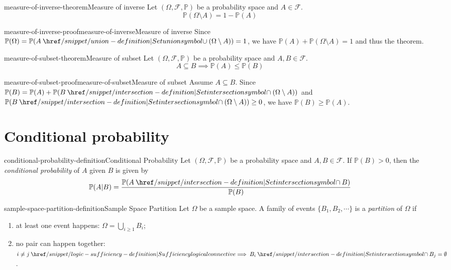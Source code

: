 \documentclass[preview]{standalone}
\begin{document}
\begin{snippettheorem}{measure-of-inverse-theorem}{Measure of inverse}
    Let \((\Omega, \mathcal{F}, \mathbb{P})\) be a probability space and \(A \in \mathcal{F}\).
    \[
        \mathbb{P}(\Omega \setminus A) = 1 - \mathbb{P}(A)
    \]
\end{snippettheorem}

\begin{snippetproof}{measure-of-inverse-proof}{measure-of-inverse}{Measure of inverse}
    Since \(\mathbb{P}(\Omega) = \mathbb{P}(A \union (\Omega \setminus A)) = 1\),
    we have \(\mathbb{P}(A) + \mathbb{P}(\Omega \setminus A) = 1\)
    and thus the theorem.
\end{snippetproof}

\begin{snippettheorem}{measure-of-subset-theorem}{Measure of subset}
    Let \((\Omega, \mathcal{F}, \mathbb{P})\) be a probability space and \(A, B \in \mathcal{F}\).
    \[
        A \subseteq B \implies \mathbb{P}(A) \leq \mathbb{P}(B)
    \]
\end{snippettheorem}

\begin{snippetproof}{measure-of-subset-proof}{measure-of-subset}{Measure of subset}
    Assume \(A \subseteq B\). Since \(\mathbb{P}(B) = \mathbb{P}(A) + \mathbb{P}(B \intersection (\Omega \setminus A))\)
    and \(\mathbb{P}(B \intersection (\Omega \setminus A)) \geq 0\), we have \(\mathbb{P}(B) \geq \mathbb{P}(A)\).
\end{snippetproof}

\section{Conditional probability}

\begin{snippetdefinition}{conditional-probability-definition}{Conditional Probability}
    Let \((\Omega, \mathcal{F}, \mathbb{P})\) be a probability space
    and \(A, B \in \mathcal{F}\).
    If \(\mathbb{P}(B) > 0\), then the \textit{conditional probability} of \(A\) given \(B\)
    is given by
    \[
        \mathbb{P}(A|B) = \frac{\mathbb{P}(A \intersection B)}{\mathbb{P}(B)}
    \]
\end{snippetdefinition}

\begin{snippetdefinition}{sample-space-partition-definition}{Sample Space Partition}
    Let \(\Omega\) be a sample space.
    A family of events \(\{B_1,B_2, \cdots\}\)
    is a \textit{partition} of \(\Omega\) if
    \begin{enumerate}
        \item at least one event happens: \(\Omega = \bigcup_{i \geq 1} B_i\);
        \item no pair can happen together: \(i \neq j \implies B_i \intersection B_j = \emptyset\).
    \end{enumerate}
\end{snippetdefinition}
\end{document}
